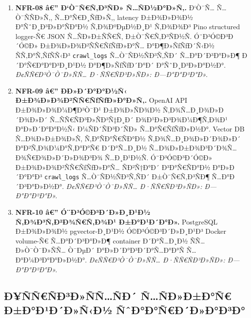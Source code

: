 \documentclass[12pt,A4]{report}
\begin{document}
\begin{enumerate}

  \item \textbf{NFR-08 â€” Ð‘Ò¯Ñ€Ñ‚Ð³ÑÐ» Ñ…ÑÐ½Ð°Ð»Ñ‚.}
        Ð‘Ò¯Ñ… Ñ…Ò¯ÑÑÐ»Ñ‚, Ñ…Ð°Ñ€Ð¸ÑƒÐ»Ñ‚, latency Ð±Ð¾Ð»Ð¾Ð½ Ð°ÑˆÐ¸Ð³Ð»Ð°ÑÐ°Ð½
        Ñ‚Ð¾ÐºÐµÐ½Ð¸Ð¹ Ñ‚Ð¾Ð¾Ð³ Pino structured logger-Ñ€ JSON
        Ñ…ÑÐ»Ð±ÑÑ€Ñ‚ Ð±Ò¯Ñ€Ñ‚Ð³ÑÐ½Ñ. Ó¨Ð³Ó©Ð³Ð´Ó©Ð» Ð±Ð¾Ð»Ð¾Ð²ÑÑ€ÑƒÑƒÐ»Ð°Ñ…
        Ð°Ð¶Ð»ÑƒÑƒÐ´Ñ‹Ð½ ÑÑ‚Ð°Ñ‚ÑƒÑÑ‹Ð³ \texttt{crawl\_logs}
        Ñ…Ò¯ÑÐ½ÑÐ³Ñ‚ÑÐ´ Ñ…Ð°Ð´Ð³Ð°Ð»Ð¶ Ð´Ð°Ñ€Ð°Ð°Ð³Ð¸Ð¹Ð½ Ð°Ð¶Ð»ÑƒÑƒÐ´Ð°Ð´ Ð°ÑˆÐ¸Ð³Ð»Ð°Ð½Ð°.
        \textit{Ð¢ÑÑ€Ð³Ò¯Ò¯Ð»ÑÑ… Ð·ÑÑ€ÑÐ³Ð»ÑÐ»: Ð—Ð°Ð°Ð²Ð°Ð».}

  \item \textbf{NFR-09 â€” ÐÐ»Ð´Ð°Ð°Ð½Ñ‹ Ð±Ð¾Ð»Ð¾Ð²ÑÑ€ÑƒÑƒÐ»Ð°Ð»Ñ‚.}
        OpenAI API Ð±Ð¾Ð»Ð¾Ð¼Ð¶Ð³Ò¯Ð¹ Ð±Ð¾Ð»ÑÐ¾Ð½ Ñ‚Ð¾Ñ…Ð¸Ð¾Ð»Ð´Ð¾Ð»Ð´
        Ñ…ÑÑ€ÑÐ³Ð»ÑÐ³Ñ‡Ð¸Ð´ Ð¾Ð¹Ð»Ð³Ð¾Ð¼Ð¶Ñ‚Ð¾Ð¹ Ð°Ð»Ð´Ð°Ð°Ð½Ñ‹ Ð¼ÑÐ´ÑÐ³Ð´ÑÐ»
        Ñ…Ð°Ñ€ÑƒÑƒÐ»Ð½Ð°. Vector DB Ñ…Ð¾Ð»Ð±Ð¾Ð»Ñ‚ Ñ‚Ð°ÑÐ°Ñ€ÑÐ°Ð½
        Ñ‚Ð¾Ñ…Ð¸Ð¾Ð»Ð´Ð¾Ð»Ð´ Ð°Ð²Ñ‚Ð¾Ð¼Ð°Ñ‚Ð°Ð°Ñ€ Ð´Ð°Ñ…Ð¸Ð½ Ñ…Ð¾Ð»Ð±Ð¾Ð³Ð´Ð¾Ñ…
        Ð¾Ñ€Ð¾Ð»Ð´Ð»Ð¾Ð³Ð¾ Ñ…Ð¸Ð¹Ð½Ñ. Ó¨Ð³Ó©Ð³Ð´Ó©Ð» Ð±Ð¾Ð»Ð¾Ð²ÑÑ€ÑƒÑƒÐ»Ð°Ñ… ÑÐ²Ñ†Ð°Ð´
        Ð³Ð°Ñ€ÑÐ°Ð½ Ð°Ð»Ð´Ð°Ð°Ð³ \texttt{crawl\_logs} Ñ…Ò¯ÑÐ½ÑÐ³Ñ‚ÑÐ´
        Ð±Ò¯Ñ€Ñ‚Ð³ÑÐ¶ Ñ…Ð°Ð´Ð³Ð°Ð»Ð½Ð°.
        \textit{Ð¢ÑÑ€Ð³Ò¯Ò¯Ð»ÑÑ… Ð·ÑÑ€ÑÐ³Ð»ÑÐ»: Ð—Ð°Ð°Ð²Ð°Ð».}

  \item \textbf{NFR-10 â€” Ó¨Ð³Ó©Ð³Ð´Ð»Ð¸Ð¹Ð½ Ñ‚Ð¾Ð³Ñ‚Ð²Ð¾Ñ€Ñ‚Ð¾Ð¹ Ð±Ð°Ð¹Ð´Ð°Ð».}
        PostgreSQL Ð±Ð¾Ð»Ð¾Ð½ pgvector-Ð¸Ð¹Ð½ Ó©Ð³Ó©Ð³Ð´Ð»Ð¸Ð¹Ð³ Docker
        volume-Ñ€ Ñ…Ð°Ð´Ð³Ð°Ð»Ð¶ container Ð´Ð°Ñ…Ð¸Ð½ ÑÑ…Ð»Ò¯Ò¯Ð»ÑÑ…
        Ò¯ÐµÐ´ Ð°Ð»Ð´Ð°Ð³Ð´Ð°Ñ…Ð°Ð°Ñ Ñ…Ð°Ð¼Ð³Ð°Ð°Ð»Ð½Ð°.
        \textit{Ð¢ÑÑ€Ð³Ò¯Ò¯Ð»ÑÑ… Ð·ÑÑ€ÑÐ³Ð»ÑÐ»: Ð—Ð°Ð°Ð²Ð°Ð».}

\end{enumerate}

\subsection{Ð¥ÑÑ€ÑÐ³Ð»ÑÑ…ÑÐ´ Ñ…ÑÐ»Ð±Ð°Ñ€ Ð±Ð°Ð¹Ð´Ð»Ñ‹Ð½ ÑˆÐ°Ð°Ñ€Ð´Ð»Ð°Ð³Ð°}
\end{document}
